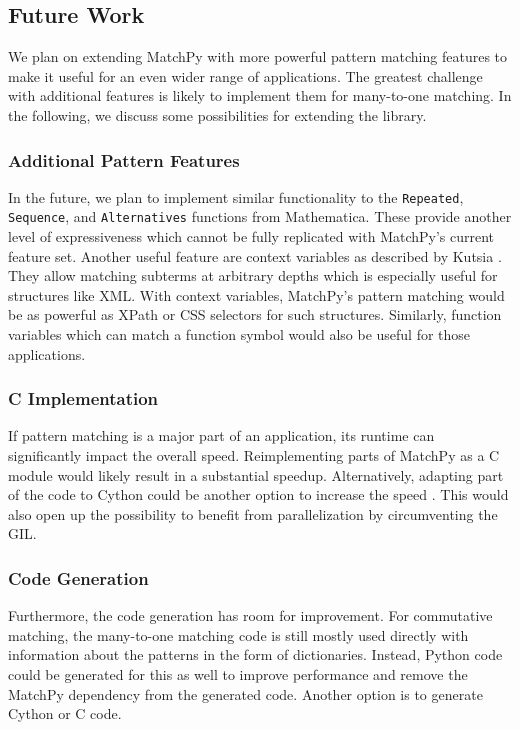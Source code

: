 \documentclass[conference,compsoc]{IEEEtran}
\begin{document}
\subsection{Future Work}

We plan on extending MatchPy with more powerful pattern matching features to make it useful for an even wider range of applications.
The greatest challenge with additional features is likely to implement them for many-to-one matching.
In the following, we discuss some possibilities for extending the library.

\subsubsection*{Additional Pattern Features}
In the future, we plan to implement similar functionality to the \texttt{Repeated}, \texttt{Sequence}, and \texttt{Alternatives} functions from Mathematica.
These provide another level of expressiveness which cannot be fully replicated with MatchPy's current feature set.
Another useful feature are context variables as described by Kutsia \cite{Kutsia2006}.
They allow matching subterms at arbitrary depths which is especially useful for structures like XML.
With context variables, MatchPy's pattern matching would be as powerful as XPath \cite{Robie2017} or CSS selectors \cite{Rivoal2017} for such structures.
Similarly, function variables which can match a function symbol would also be useful for those applications.

\subsubsection*{C Implementation}
If pattern matching is a major part of an application, its runtime can significantly impact the overall speed.
Reimplementing parts of MatchPy as a C module would likely result in a substantial speedup.
Alternatively, adapting part of the code to Cython could be another option to increase the speed \cite{Behnel2009, Wilbers2009}.
This would also open up the possibility to benefit from parallelization by circumventing the GIL.

\subsubsection*{Code Generation}
Furthermore, the code generation has room for improvement.
For commutative matching, the many-to-one matching code is still mostly used directly with information about the patterns in the form of dictionaries.
Instead, Python code could be generated for this as well to improve performance and remove the MatchPy dependency from the generated code.
Another option is to generate Cython or C code.



\end{document}
